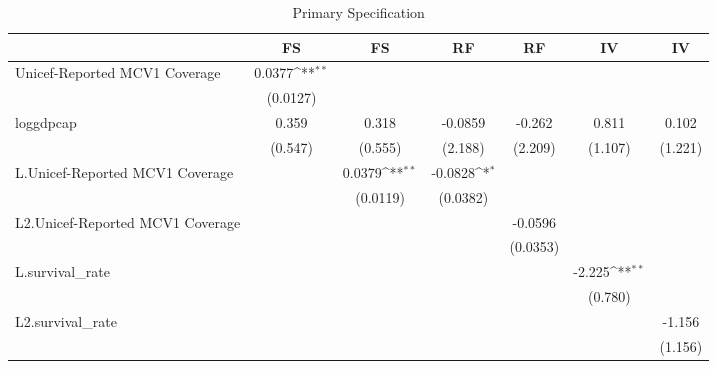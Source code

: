 \begin{table}[htbp]\centering
\def\sym#1{\ifmmode^{#1}\else\(^{#1}\)\fi}
\caption{Primary Specification}
\begin{tabular}{l*{6}{c}}
\toprule
                &\multicolumn{1}{c}{FS}&\multicolumn{1}{c}{FS}&\multicolumn{1}{c}{RF}&\multicolumn{1}{c}{RF}&\multicolumn{1}{c}{IV}&\multicolumn{1}{c}{IV}\\
\midrule
Unicef-Reported MCV1 Coverage&   0.0377\sym{**} &                  &                  &                  &                  &                  \\
                & (0.0127)         &                  &                  &                  &                  &                  \\
\addlinespace
loggdpcap       &    0.359         &    0.318         &  -0.0859         &   -0.262         &    0.811         &    0.102         \\
                &  (0.547)         &  (0.555)         &  (2.188)         &  (2.209)         &  (1.107)         &  (1.221)         \\
\addlinespace
L.Unicef-Reported MCV1 Coverage&                  &   0.0379\sym{**} &  -0.0828\sym{*}  &                  &                  &                  \\
                &                  & (0.0119)         & (0.0382)         &                  &                  &                  \\
\addlinespace
L2.Unicef-Reported MCV1 Coverage&                  &                  &                  &  -0.0596         &                  &                  \\
                &                  &                  &                  & (0.0353)         &                  &                  \\
\addlinespace
L.survival\_rate &                  &                  &                  &                  &   -2.225\sym{**} &                  \\
                &                  &                  &                  &                  &  (0.780)         &                  \\
\addlinespace
L2.survival\_rate&                  &                  &                  &                  &                  &   -1.156         \\
                &                  &                  &                  &                  &                  &  (1.156)         \\

\end{tabular}
\end{table}
